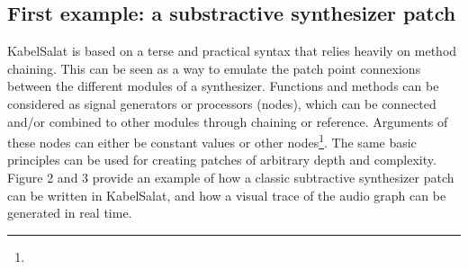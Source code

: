 \documentclass[11pt,]{article}
\begin{document}
\newpage

\subsection{First example: a substractive synthesizer
patch}\label{first-example-a-substractive-synthesizer-patch}

KabelSalat is based on a terse and practical syntax that relies heavily
on method chaining. This can be seen as a way to emulate the patch point
connexions between the different modules of a synthesizer. Functions and
methods can be considered as signal generators or processors (nodes),
which can be connected and/or combined to other modules through chaining
or reference. Arguments of these nodes can either be constant values or
other nodes\footnote{}. The same basic principles can be used for
creating patches of arbitrary depth and complexity. Figure 2 and 3
provide an example of how a classic subtractive synthesizer patch can be
written in KabelSalat, and how a visual trace of the audio graph can be
generated in real time.
\end{document}

